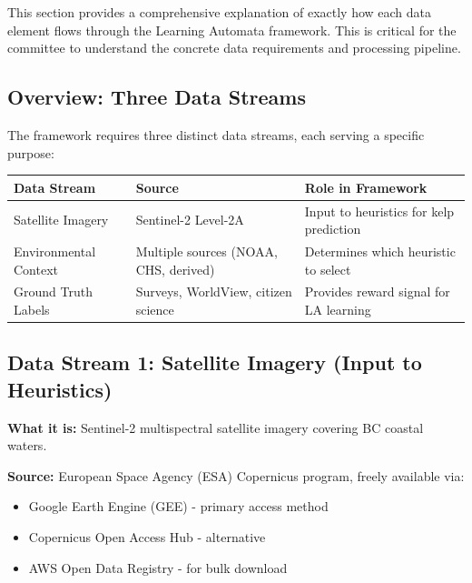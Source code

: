 \documentclass[11pt]{article}
\begin{document}
This section provides a comprehensive explanation of exactly how each data element flows through the Learning Automata framework. This is critical for the committee to understand the concrete data requirements and processing pipeline.

\subsection{Overview: Three Data Streams}

The framework requires three distinct data streams, each serving a specific purpose:

\begin{center}
\begin{tabular}{p{3cm}p{4cm}p{5cm}}
\toprule
\textbf{Data Stream} & \textbf{Source} & \textbf{Role in Framework} \\
\midrule
Satellite Imagery & Sentinel-2 Level-2A & Input to heuristics for kelp prediction \\
Environmental Context & Multiple sources (NOAA, CHS, derived) & Determines which heuristic to select \\
Ground Truth Labels & Surveys, WorldView, citizen science & Provides reward signal for LA learning \\
\bottomrule
\end{tabular}
\end{center}

\subsection{Data Stream 1: Satellite Imagery (Input to Heuristics)}

\textbf{What it is:} Sentinel-2 multispectral satellite imagery covering BC coastal waters.

\textbf{Source:} European Space Agency (ESA) Copernicus program, freely available via:
\begin{itemize}
    \item Google Earth Engine (GEE) - primary access method
    \item Copernicus Open Access Hub - alternative
    \item AWS Open Data Registry - for bulk download
\end{itemize}
\end{document}
